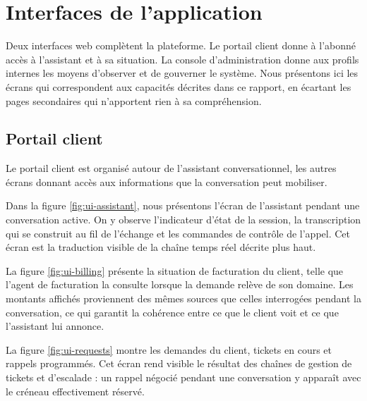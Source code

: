
\section{Interfaces de l'application}

Deux interfaces web complètent la plateforme. Le portail client donne à l'abonné accès à l'assistant et à sa situation. La console d'administration donne aux profils internes les moyens d'observer et de gouverner le système. Nous présentons ici les écrans qui correspondent aux capacités décrites dans ce rapport, en écartant les pages secondaires qui n'apportent rien à sa compréhension.

\subsection{Portail client}

Le portail client est organisé autour de l'assistant conversationnel, les autres écrans donnant accès aux informations que la conversation peut mobiliser.

Dans la figure \ref{fig:ui-assistant}, nous présentons l'écran de l'assistant pendant une conversation active. On y observe l'indicateur d'état de la session, la transcription qui se construit au fil de l'échange et les commandes de contrôle de l'appel. Cet écran est la traduction visible de la chaîne temps réel décrite plus haut.


La figure \ref{fig:ui-billing} présente la situation de facturation du client, telle que l'agent de facturation la consulte lorsque la demande relève de son domaine. Les montants affichés proviennent des mêmes sources que celles interrogées pendant la conversation, ce qui garantit la cohérence entre ce que le client voit et ce que l'assistant lui annonce.


La figure \ref{fig:ui-requests} montre les demandes du client, tickets en cours et rappels programmés. Cet écran rend visible le résultat des chaînes de gestion de tickets et d'escalade : un rappel négocié pendant une conversation y apparaît avec le créneau effectivement réservé.

